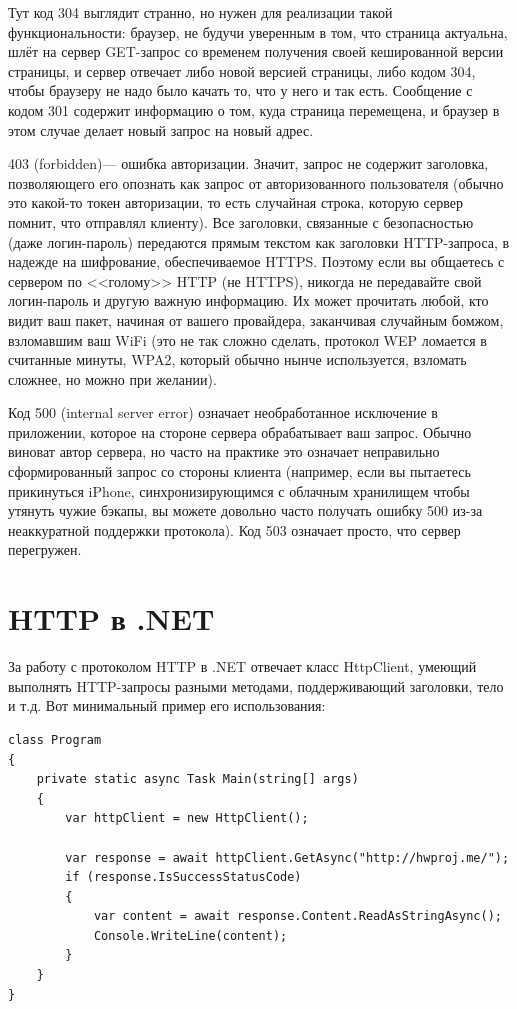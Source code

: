 \documentclass{../../text-style}
\begin{document}
Тут код 304 выглядит странно, но нужен для реализации такой функциональности: браузер, не будучи уверенным в том, что страница актуальна, шлёт на сервер GET-запрос со временем получения своей кешированной версии страницы, и сервер отвечает либо новой версией страницы, либо кодом 304, чтобы браузеру не надо было качать то, что у него и так есть. Сообщение с кодом 301 содержит информацию о том, куда страница перемещена, и браузер в этом случае делает новый запрос на новый адрес.

403 (forbidden)--- ошибка авторизации. Значит, запрос не содержит заголовка, позволяющего его опознать как запрос от авторизованного пользователя (обычно это какой-то токен авторизации, то есть случайная строка, которую сервер помнит, что отправлял клиенту). Все заголовки, связанные с безопасностью (даже логин-пароль) передаются прямым текстом как заголовки HTTP-запроса, в надежде на шифрование, обеспечиваемое HTTPS. Поэтому если вы общаетесь с сервером по <<голому>> HTTP (не HTTPS), никогда не передавайте свой логин-пароль и другую важную информацию. Их может прочитать любой, кто видит ваш пакет, начиная от вашего провайдера, заканчивая случайным бомжом, взломавшим ваш WiFi (это не так сложно сделать, протокол WEP ломается в считанные минуты, WPA2, который обычно нынче используется, взломать сложнее, но можно при желании).

Код 500 (internal server error) означает необработанное исключение в приложении, которое на стороне сервера обрабатывает ваш запрос. Обычно виноват автор сервера, но часто на практике это означает неправильно сформированный запрос со стороны клиента (например, если вы пытаетесь прикинуться iPhone, синхронизирующимся с облачным хранилищем чтобы утянуть чужие бэкапы, вы можете довольно часто получать ошибку 500 из-за неаккуратной поддержки протокола). Код 503 означает просто, что сервер перегружен.

\section{HTTP в .NET}

За работу с протоколом HTTP в .NET отвечает класс HttpClient, умеющий выполнять HTTP-запросы разными методами, поддерживающий заголовки, тело и т.д. Вот минимальный пример его использования: 

\begin{verbatim}
class Program
{
    private static async Task Main(string[] args)
    {
        var httpClient = new HttpClient();

        var response = await httpClient.GetAsync("http://hwproj.me/");
        if (response.IsSuccessStatusCode)
        {
            var content = await response.Content.ReadAsStringAsync();
            Console.WriteLine(content);
        }
    }
}
\end{verbatim}
\end{document}
